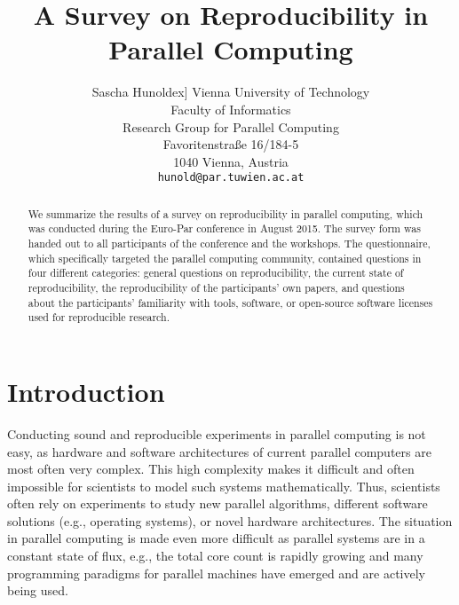\documentclass{article}\usepackage[]{graphicx}\usepackage[]{color}
\date{\vspace{-5ex}}
\newcommand{\eg}{e.g.\xspace}
\newcommand{\europar}{Euro-Par\xspace}
\begin{document}
\title{A Survey on Reproducibility in Parallel Computing}

\author{
Sascha Hunold\1ex]
Vienna University of Technology\\Faculty of
    Informatics\\ 
    Research Group for Parallel Computing\\
    Favoritenstra\ss{}e 16/184-5\\1040 Vienna, Austria\protect\\
    \texttt{hunold@par.tuwien.ac.at}
}

    
\maketitle

\begin{abstract}
  We summarize the results of a survey on reproducibility in parallel
  computing, which was conducted during the \europar conference in
  August 2015. The survey form was handed out to all participants of
  the conference and the workshops. The questionnaire, which
  specifically targeted the parallel computing community, contained
  questions in four different categories: general questions on
  reproducibility, the current state of reproducibility, the
  reproducibility of the participants' own papers, and questions about
  the participants' familiarity with tools, software, or open-source
  software licenses used for reproducible research.
\end{abstract}

\section{Introduction}

Conducting sound and reproducible experiments in parallel computing is
not easy, as hardware and software architectures of current parallel
computers are most often very complex. This high complexity makes it
difficult and often impossible for scientists to model such systems
mathematically. Thus, scientists often rely on experiments to study
new parallel algorithms, different software solutions (\eg, operating
systems), or novel hardware architectures. The situation in parallel
computing is made even more difficult as parallel systems are in a
constant state of flux, \eg, the total core count is rapidly growing
and many programming paradigms for parallel machines have emerged  and
are actively being used.
\end{document}
